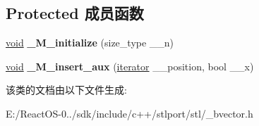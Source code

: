 \subsection*{Protected 成员函数}
\begin{DoxyCompactItemize}
\item 
\mbox{\label{class_____b_v_e_c_t_o_r___q_u_a_l_i_f_i_e_d_af35e7cca9c56a10faeef77979a2e5ece}} 
\hyperlink{interfacevoid}{void} {\bfseries \+\_\+\+M\+\_\+initialize} (size\+\_\+type \+\_\+\+\_\+n)
\item 
\mbox{\label{class_____b_v_e_c_t_o_r___q_u_a_l_i_f_i_e_d_a9dc501089022a3d11331b2927e310e06}} 
\hyperlink{interfacevoid}{void} {\bfseries \+\_\+\+M\+\_\+insert\+\_\+aux} (\hyperlink{structiterator}{iterator} \+\_\+\+\_\+position, bool \+\_\+\+\_\+x)
\end{DoxyCompactItemize}


该类的文档由以下文件生成\+:\begin{DoxyCompactItemize}
\item 
E\+:/\+React\+O\+S-\/0../sdk/include/c++/stlport/stl/\+\_\+bvector.\+h\end{DoxyCompactItemize}
